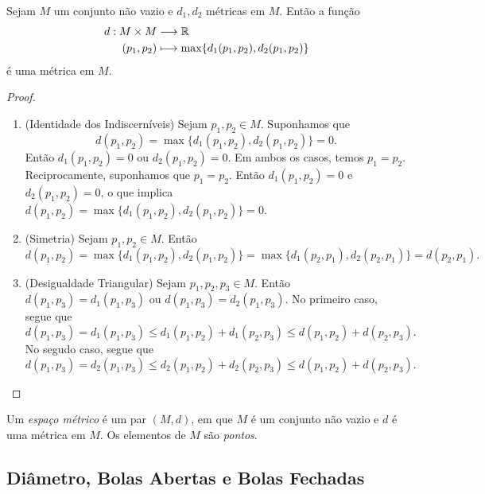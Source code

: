 \begin{prop}
	Sejam $M$ um conjunto não vazio e $d_1,d_2$ métricas em $M$. Então a função
	\begin{align*}
	d: M \times M &\longrightarrow \mathbb{R} \\
	 (p_1,p_2) &\longmapsto \max\{d_1(p_1,p_2),d_2(p_1,p_2)\}
	\end{align*}
é uma métrica em $M$.
\end{prop}
\begin{proof}
	\begin{enumerate}
	\item (Identidade dos Indiscerníveis) Sejam $p_1,p_2 \in M$. Suponhamos que
	\begin{equation*}
	d(p_1,p_2)=\max\{d_1(p_1,p_2),d_2(p_1,p_2)\}=0.
	\end{equation*}
Então $d_1(p_1,p_2)=0$ ou $d_2(p_1,p_2)=0$. Em ambos os casos, temos $p_1=p_2$. Reciprocamente, suponhamos que $p_1=p_2$. Então $d_1(p_1,p_2)=0$ e $d_2(p_1,p_2)=0$, o que implica $d(p_1,p_2)=\max\{d_1(p_1,p_2),d_2(p_1,p_2)\}=0$.
	
	\item (Simetria) Sejam $p_1,p_2 \in M$. Então
	\begin{equation*}
	d(p_1,p_2) = \max\{d_1(p_1,p_2),d_2(p_1,p_2)\} = \max\{d_1(p_2,p_1),d_2(p_2,p_1)\} = d(p_2,p_1).
	\end{equation*}
	
	\item (Desigualdade Triangular) Sejam $p_1,p_2,p_3 \in M$. Então $d(p_1,p_3)=d_1(p_1,p_3)$ ou $d(p_1,p_3)=d_2(p_1,p_3)$. No primeiro caso, segue que
	\begin{equation*}
	d(p_1,p_3) = d_1(p_1,p_3) \leq d_1(p_1,p_2) + d_1(p_2,p_3) \leq d(p_1,p_2) + d(p_2,p_3).
	\end{equation*}
	No segudo caso, segue que
	\begin{equation*}
	d(p_1,p_3) = d_2(p_1,p_3) \leq d_2(p_1,p_2) + d_2(p_2,p_3) \leq d(p_1,p_2) + d(p_2,p_3).
	\end{equation*}
	\end{enumerate}
\end{proof}

\begin{defi}
	Um \emph{espaço métrico} é um par $(M,d)$, em que $M$ é um conjunto não vazio e $d$ é uma métrica em $M$. Os elementos de $M$ são \emph{pontos}.
\end{defi}

\subsection{Diâmetro, Bolas Abertas e Bolas Fechadas}

